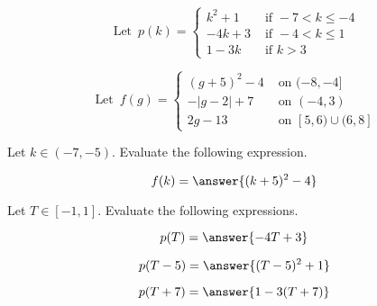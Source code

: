 \documentclass{ximera}
\author{Lee Wayand}
\begin{document}
\[
\text{ Let } \, p(k) = 
\begin{cases}
  k^2 + 1 & \text{ if } -7 < k \leq -4 \\
  -4k + 3 & \text{ if } -4 < k \leq 1 \\
  1 - 3k & \text{ if } k > 3
\end{cases}
\]







\[
\text{ Let } \, f(g) = 
\begin{cases}
  (g+5)^2 - 4 & \text{ on } (-8,-4] \\
  -|g-2|+7 & \text{ on } (-4,3) \\
  2g-13 & \text{ on } [5,6) \cup (6,8]
\end{cases}
\]












\begin{exercise} Let $k \in (-7, -5)$.  Evaluate the following expression.

\[
f(k) = \answer{(k+5)^2 - 4}
\]

\end{exercise}











\begin{exercise} Let $T \in [-1, 1]$.  Evaluate the following expressions.

\[
p(T) = \answer{-4 T + 3}
\]

\[
p(T - 5) = \answer{(T-5)^2 + 1}
\]

\[
p(T+7) = \answer{1 - 3(T+7)}
\]

\end{exercise}
\end{document}
